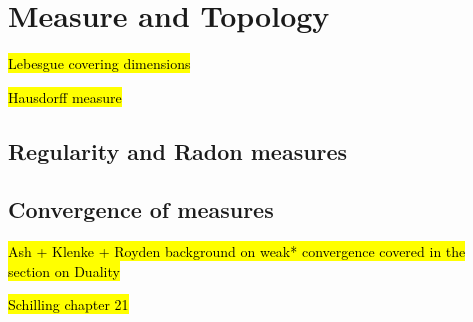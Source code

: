 
\chapter{Measure and Topology\label{chap:measureAndTopology}}



\hl{Lebesgue covering dimensions}

\hl{Hausdorff measure}

\section{Regularity and Radon measures}

\section{Convergence of measures}

\hl{Ash + Klenke + Royden background on weak* convergence covered in the section on Duality}

\hl{Schilling chapter 21}
